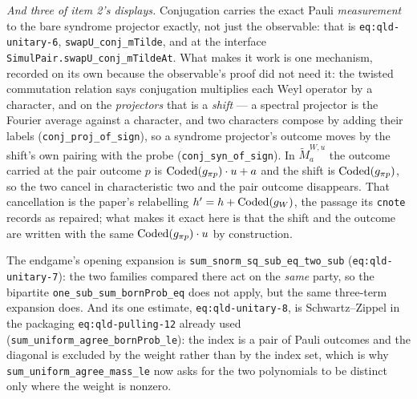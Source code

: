 \emph{And three of item 2's displays.} Conjugation carries the exact Pauli \emph{measurement} to
the bare syndrome projector exactly, not just the observable: that is \texttt{eq:qld-unitary-6},
\texttt{swapU\_conj\_mTilde}, and at the interface
\texttt{SimulPair.swapU\_conj\_mTildeAt}. What makes it work is one mechanism, recorded on its
own because the observable's proof did not need it: the twisted commutation relation says
conjugation multiplies each Weyl operator by a character, and on the \emph{projectors} that is a
\emph{shift} --- a spectral projector is the Fourier average against a character, and two
characters compose by adding their labels (\texttt{conj\_proj\_of\_sign}), so a syndrome
projector's outcome moves by the shift's own pairing with the probe
(\texttt{conj\_syn\_of\_sign}). In $\tilde{M}^{W,u}_a$ the outcome carried at the pair outcome
$p$ is $\mathrm{Coded}(g_{\pi p}) \cdot u + a$ and the shift is $\mathrm{Coded}(g_{\pi p})$, so the two cancel in
characteristic two and the pair outcome disappears. That cancellation is the paper's relabelling
$h' = h + \mathrm{Coded}(g_W)$, the passage its \texttt{cnote} records as repaired; what makes it exact
here is that the shift and the outcome are written with the same $\mathrm{Coded}(g_{\pi p}) \cdot u$ by
construction.

The endgame's opening expansion is \texttt{sum\_snorm\_sq\_sub\_eq\_two\_sub}
(\texttt{eq:qld-unitary-7}): the two families compared there act on the \emph{same} party, so the
bipartite \texttt{one\_sub\_sum\_bornProb\_eq} does not apply, but the same three-term
expansion does. And its one estimate, \texttt{eq:qld-unitary-8}, is Schwartz--Zippel in the
packaging \texttt{eq:qld-pulling-12} already used
(\texttt{sum\_uniform\_agree\_bornProb\_le}): the index is a pair of Pauli outcomes and the
diagonal is excluded by the weight rather than by the index set, which is why
\texttt{sum\_uniform\_agree\_mass\_le} now asks for the two polynomials to be distinct only
where the weight is nonzero.

